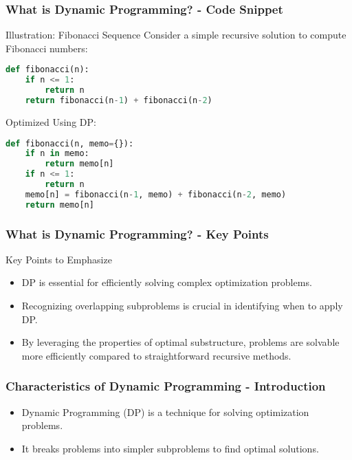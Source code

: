 \documentclass[aspectratio=169]{beamer}
\begin{document}
\begin{frame}[fragile]
  \frametitle{What is Dynamic Programming? - Code Snippet}
  \begin{block}{Illustration: Fibonacci Sequence}
    Consider a simple recursive solution to compute Fibonacci numbers:
    \begin{lstlisting}[language=Python]
def fibonacci(n):
    if n <= 1:
        return n
    return fibonacci(n-1) + fibonacci(n-2)
    \end{lstlisting}
    
    Optimized Using DP: 
    \begin{lstlisting}[language=Python]
def fibonacci(n, memo={}):
    if n in memo:
        return memo[n]
    if n <= 1:
        return n
    memo[n] = fibonacci(n-1, memo) + fibonacci(n-2, memo)
    return memo[n]
    \end{lstlisting}
  \end{block}
\end{frame}

\begin{frame}[fragile]
  \frametitle{What is Dynamic Programming? - Key Points}
  \begin{block}{Key Points to Emphasize}
    \begin{itemize}
      \item DP is essential for efficiently solving complex optimization problems.
      \item Recognizing overlapping subproblems is crucial in identifying when to apply DP.
      \item By leveraging the properties of optimal substructure, problems are solvable more efficiently compared to straightforward recursive methods.
    \end{itemize}
  \end{block}
\end{frame}

\begin{frame}[fragile]
    \frametitle{Characteristics of Dynamic Programming - Introduction}
    \begin{itemize}
        \item Dynamic Programming (DP) is a technique for solving optimization problems.
        \item It breaks problems into simpler subproblems to find optimal solutions.
    \end{itemize}
\end{frame}
\end{document}
